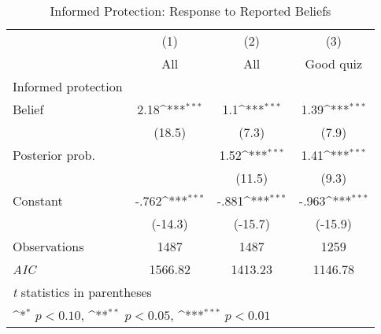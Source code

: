 \begin{table}[htbp]\centering
\def\sym#1{\ifmmode^{#1}\else\(^{#1}\)\fi}
\caption{Informed Protection: Response to Reported Beliefs}
\begin{tabular}{l*{3}{c}}
\hline\hline
                &\multicolumn{1}{c}{(1)}&\multicolumn{1}{c}{(2)}&\multicolumn{1}{c}{(3)}\\
                &\multicolumn{1}{c}{All}&\multicolumn{1}{c}{All}&\multicolumn{1}{c}{Good quiz}\\
\hline
Informed protection&                  &                  &                  \\
Belief          &     2.18\sym{***}&      1.1\sym{***}&     1.39\sym{***}\\
                &   (18.5)         &    (7.3)         &    (7.9)         \\
Posterior prob. &                  &     1.52\sym{***}&     1.41\sym{***}\\
                &                  &   (11.5)         &    (9.3)         \\
Constant        &    -.762\sym{***}&    -.881\sym{***}&    -.963\sym{***}\\
                &  (-14.3)         &  (-15.7)         &  (-15.9)         \\
\hline
Observations    &     1487         &     1487         &     1259         \\
\textit{AIC}    &  1566.82         &  1413.23         &  1146.78         \\
\hline\hline
\multicolumn{4}{l}{\footnotesize \textit{t} statistics in parentheses}\\
\multicolumn{4}{l}{\footnotesize \sym{*} \(p<0.10\), \sym{**} \(p<0.05\), \sym{***} \(p<0.01\)}\\
\end{tabular}
\end{table}
